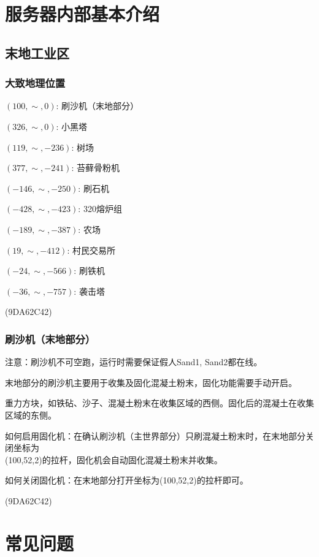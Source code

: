 \documentclass[UTF8,a4paper]{article}
\begin{document}
	\section{服务器内部基本介绍}
		\subsection{末地工业区}
			\subsubsection{大致地理位置}
				\par $(100,\sim,0)$: 刷沙机（末地部分）
				\par $(326,\sim,0)$: 小黑塔
				\par $(119,\sim,-236)$: 树场
				\par $(377,\sim,-241)$: 苔藓骨粉机
				\par $(-146,\sim,-250)$: 刷石机
				\par $(-428,\sim,-423)$: 320熔炉组
				\par $(-189,\sim,-387)$: 农场
				\par $(19,\sim,-412)$: 村民交易所
				\par $(-24,\sim,-566)$: 刷铁机
				\par $(-36,\sim,-757)$: 袭击塔
				\begin{flushright}(9DA62C42)\end{flushright}
			\subsubsection{刷沙机（末地部分）}
				\par 注意：刷沙机不可空跑，运行时需要保证假人Sand1, Sand2都在线。
				\par 末地部分的刷沙机主要用于收集及固化混凝土粉末，固化功能需要手动开启。
				\par 重力方块，如铁砧、沙子、混凝土粉末在收集区域的西侧。固化后的混凝土在收集区域的东侧。
				\par 如何启用固化机：在确认刷沙机（主世界部分）只刷混凝土粉末时，在末地部分关闭坐标为 \\ (100,52,2)的拉杆，固化机会自动固化混凝土粉末并收集。
				\par 如何关闭固化机：在末地部分打开坐标为(100,52,2)的拉杆即可。
				\begin{flushright}(9DA62C42)\end{flushright}
	\section{常见问题}
\end{document}
